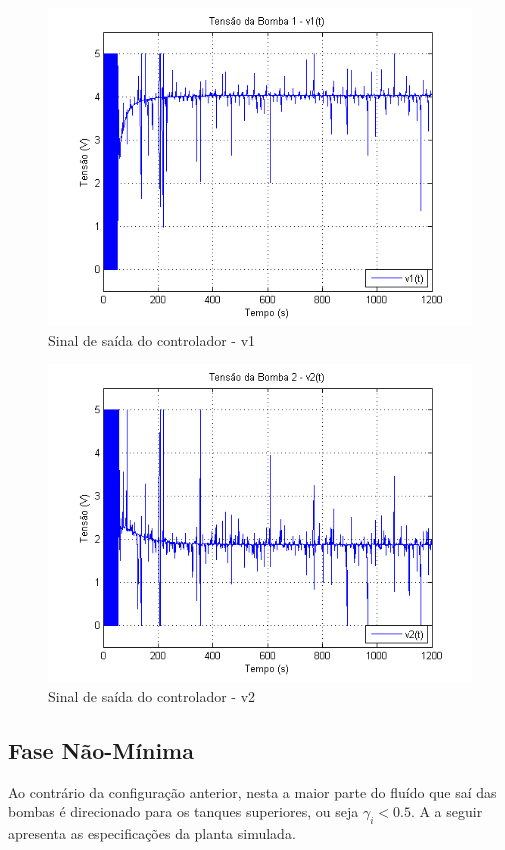 \begin{figure}[H]
	\centering
	\includegraphics[height=0.35\paperheight ,keepaspectratio]{img/fm_u1_wind.png}
	\caption{\small Sinal de saída do controlador - v1 }
	\label{figFm_u1_wind}
\end{figure}

\begin{figure}[H]
	\centering
	\includegraphics[height=0.35\paperheight ,keepaspectratio]{img/fm_u2_wind.png}
	\caption{Sinal de saída do controlador - v2 }
	\label{figFm_u2_wind}
\end{figure}

\subsection{Fase Não-Mínima}
Ao contrário da configuração anterior, nesta a maior parte do fluído que saí das bombas é direcionado  para os tanques superiores, ou seja $\gamma_i < 0.5$. A  a seguir apresenta as especificações da planta simulada.

